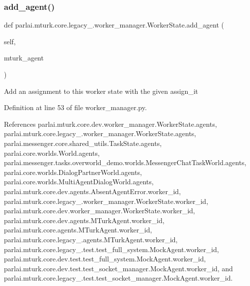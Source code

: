 \mbox{\label{classparlai_1_1mturk_1_1core_1_1legacy__2018_1_1worker__manager_1_1WorkerState_a22b3660299c3dd56fb396bf9d6672d2a}} 
\subsubsection{\texorpdfstring{add\+\_\+agent()}{add\_agent()}}
{\footnotesize\ttfamily def parlai.\+mturk.\+core.\+legacy\+\_.\+worker\+\_\+manager.\+Worker\+State.\+add\+\_\+agent (\begin{DoxyParamCaption}\item[{}]{self,  }\item[{}]{mturk\+\_\+agent }\end{DoxyParamCaption})}

\begin{DoxyVerb}Add an assignment to this worker state with the given assign_it\end{DoxyVerb}
 

Definition at line 53 of file worker\+\_\+manager.\+py.



References parlai.\+mturk.\+core.\+dev.\+worker\+\_\+manager.\+Worker\+State.\+agents, parlai.\+mturk.\+core.\+legacy\+\_.\+worker\+\_\+manager.\+Worker\+State.\+agents, parlai.\+messenger.\+core.\+shared\+\_\+utils.\+Task\+State.\+agents, parlai.\+core.\+worlds.\+World.\+agents, parlai.\+messenger.\+tasks.\+overworld\+\_\+demo.\+worlds.\+Messenger\+Chat\+Task\+World.\+agents, parlai.\+core.\+worlds.\+Dialog\+Partner\+World.\+agents, parlai.\+core.\+worlds.\+Multi\+Agent\+Dialog\+World.\+agents, parlai.\+mturk.\+core.\+dev.\+agents.\+Absent\+Agent\+Error.\+worker\+\_\+id, parlai.\+mturk.\+core.\+legacy\+\_.\+worker\+\_\+manager.\+Worker\+State.\+worker\+\_\+id, parlai.\+mturk.\+core.\+dev.\+worker\+\_\+manager.\+Worker\+State.\+worker\+\_\+id, parlai.\+mturk.\+core.\+dev.\+agents.\+M\+Turk\+Agent.\+worker\+\_\+id, parlai.\+mturk.\+core.\+agents.\+M\+Turk\+Agent.\+worker\+\_\+id, parlai.\+mturk.\+core.\+legacy\+\_.\+agents.\+M\+Turk\+Agent.\+worker\+\_\+id, parlai.\+mturk.\+core.\+legacy\+\_.\+test.\+test\+\_\+full\+\_\+system.\+Mock\+Agent.\+worker\+\_\+id, parlai.\+mturk.\+core.\+dev.\+test.\+test\+\_\+full\+\_\+system.\+Mock\+Agent.\+worker\+\_\+id, parlai.\+mturk.\+core.\+dev.\+test.\+test\+\_\+socket\+\_\+manager.\+Mock\+Agent.\+worker\+\_\+id, and parlai.\+mturk.\+core.\+legacy\+\_.\+test.\+test\+\_\+socket\+\_\+manager.\+Mock\+Agent.\+worker\+\_\+id.


